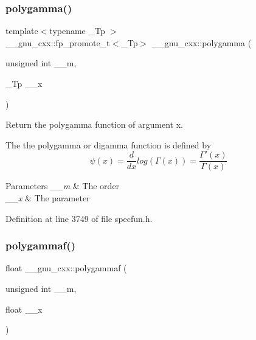 \subsubsection{\texorpdfstring{polygamma()}{polygamma()}}
{\footnotesize\ttfamily template$<$typename \+\_\+\+Tp $>$ \\
\+\_\+\+\_\+gnu\+\_\+cxx\+::fp\+\_\+promote\+\_\+t$<$\+\_\+\+Tp$>$ \+\_\+\+\_\+gnu\+\_\+cxx\+::polygamma (\begin{DoxyParamCaption}\item[{unsigned int}]{\+\_\+\+\_\+m,  }\item[{\+\_\+\+Tp}]{\+\_\+\+\_\+x }\end{DoxyParamCaption})\hspace{0.3cm}{\ttfamily [inline]}}

Return the polygamma function of argument {\ttfamily x}.

The the polygamma or digamma function is defined by \[ \psi(x) = \frac{d}{dx}log\left(\Gamma(x)\right) = \frac{\Gamma'(x)}{\Gamma(x)} \]


\begin{DoxyParams}{Parameters}
{\em \+\_\+\+\_\+m} & The order \\
\hline
{\em \+\_\+\+\_\+x} & The parameter \\
\hline
\end{DoxyParams}


Definition at line 3749 of file specfun.\+h.

\mbox{\label{group__mathsf__gnu_ga91861fadef76d4f73afacffcac66e312}} 
\subsubsection{\texorpdfstring{polygammaf()}{polygammaf()}}
{\footnotesize\ttfamily float \+\_\+\+\_\+gnu\+\_\+cxx\+::polygammaf (\begin{DoxyParamCaption}\item[{unsigned int}]{\+\_\+\+\_\+m,  }\item[{float}]{\+\_\+\+\_\+x }\end{DoxyParamCaption})\hspace{0.3cm}{\ttfamily [inline]}}

